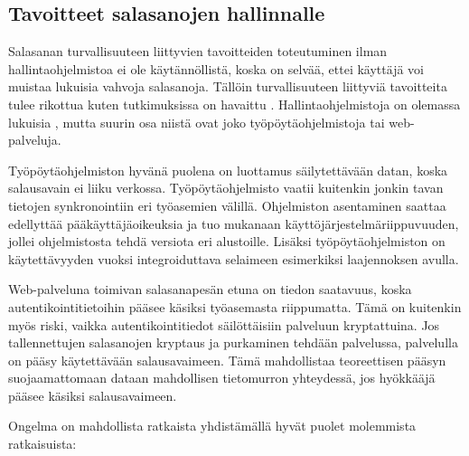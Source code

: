\documentclass{tktltiki}
\begin{document}
\subsection{Tavoitteet salasanojen hallinnalle}
  \label{sec:goals_for_pw_management}
  
Salasanan turvallisuuteen liittyvien tavoitteiden toteutuminen ilman hallintaohjelmistoa ei ole käytännöllistä, koska on selvää, ettei käyttäjä voi muistaa lukuisia vahvoja salasanoja. Tällöin turvallisuuteen liittyviä tavoitteita tulee rikottua kuten tutkimuksissa on havaittu \cite{study_of_passwords_07, password_management_strategies_06}. Hallintaohjelmistoja on olemassa lukuisia \cite{dunn_password_managers_08}, mutta suurin osa niistä ovat joko työpöytäohjelmistoja tai web-palveluja.

Työpöytäohjelmiston hyvänä puolena on luottamus säilytettävään datan, koska salausavain ei liiku verkossa. Työpöytäohjelmisto vaatii kuitenkin jonkin tavan tietojen synkronointiin eri työasemien välillä. Ohjelmiston asentaminen saattaa edellyttää pääkäyttäjäoikeuksia ja tuo mukanaan käyttöjärjestelmäriippuvuuden, jollei ohjelmistosta tehdä versiota eri alustoille. Lisäksi työpöytäohjelmiston on käytettävyyden vuoksi integroiduttava selaimeen esimerkiksi laajennoksen avulla.

Web-palveluna toimivan salasanapesän etuna on tiedon saatavuus, koska autentikointitietoihin pääsee käsiksi työasemasta riippumatta. Tämä on kuitenkin myös riski, vaikka autentikointitiedot säilöttäisiin palveluun kryptattuina. Jos tallennettujen salasanojen kryptaus ja purkaminen tehdään palvelussa, palvelulla on pääsy käytettävään salausavaimeen. Tämä mahdollistaa teoreettisen pääsyn suojaamattomaan dataan mahdollisen tietomurron yhteydessä, jos hyökkääjä pääsee käsiksi salausavaimeen.

Ongelma on mahdollista ratkaista yhdistämällä hyvät puolet molemmista ratkaisuista:
\end{document}
